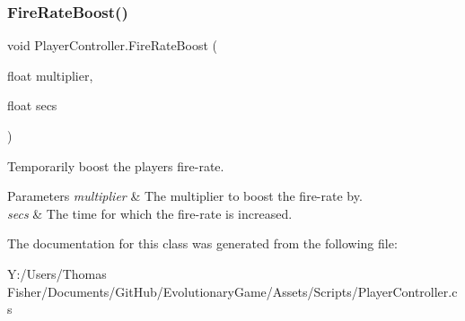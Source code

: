 \subsubsection{\texorpdfstring{Fire\+Rate\+Boost()}{FireRateBoost()}}
{\footnotesize\ttfamily void Player\+Controller.\+Fire\+Rate\+Boost (\begin{DoxyParamCaption}\item[{float}]{multiplier,  }\item[{float}]{secs }\end{DoxyParamCaption})}



Temporarily boost the player\textquotesingle{}s fire-\/rate. 


\begin{DoxyParams}{Parameters}
{\em multiplier} & The multiplier to boost the fire-\/rate by.\\
\hline
{\em secs} & The time for which the fire-\/rate is increased.\\
\hline
\end{DoxyParams}


The documentation for this class was generated from the following file\+:\begin{DoxyCompactItemize}
\item 
Y\+:/\+Users/\+Thomas Fisher/\+Documents/\+Git\+Hub/\+Evolutionary\+Game/\+Assets/\+Scripts/Player\+Controller.\+cs\end{DoxyCompactItemize}

